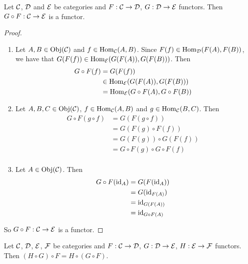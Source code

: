 \documentclass{book}
\begin{document}
	\begin{ex}  
		Let $\mathcal{C}$, $\mathcal{D}$ and $\mathcal{E}$ be categories and $F:\mathcal{C} \rightarrow \mathcal{D}$, $G: \mathcal{D} \rightarrow \mathcal{E}$ functors. Then  $G \circ F: \mathcal{C} \rightarrow \mathcal{E}$ is a functor.
	\end{ex}

	\begin{proof}\
		\begin{enumerate}
				\item Let $A, B \in \operatorname{Obj}(\mathcal{C})$ and $f \in \operatorname{Hom}_{\mathcal{C}}(A,B)$. Since $F(f) \in \operatorname{Hom}_{\mathcal{D}}(F(A), F(B))$, we have that $G(F(f)) \in \operatorname{Hom}_{\mathcal{E}}(G(F(A)), G(F(B)))$. Then 
			\begin{align*}
				G \circ F (f) 
				& = G(F(f)) \\
				& \in \operatorname{Hom}_{\mathcal{E}}(G(F(A)), G(F(B))) \\
				& =  \operatorname{Hom}_{\mathcal{E}}(G \circ F(A), G \circ F (B)) \\
			\end{align*}
			\item Let $A,B, C \in \operatorname{Obj}(\mathcal{C})$, $f \in \operatorname{Hom}_{\mathcal{C}}(A,B)$ and $g \in \operatorname{Hom}_{\mathcal{C}}(B, C)$. Then 
			\begin{align*}
				G \circ F(g \circ f) 
				& = G (F (g \circ f)) \\
				& = G(F(g) \circ F(f)) \\
				& = G(F(g)) \circ G(F(f)) \\
				& = G \circ F (g) \circ G \circ F (f) \\
			\end{align*}
			\item Let $A \in \operatorname{Obj}(\mathcal{C})$. Then 
			\begin{align*}
				G \circ F(\operatorname{id}_{A})
				& = G(F(\operatorname{id}_A) )\\
				& = G(\operatorname{id}_{F(A)}) \\
				& = \operatorname{id}_{G(F(A))} \\
				& = \operatorname{id}_{G \circ F(A)} 
			\end{align*}
		\end{enumerate}
		So $G \circ F: \mathcal{C} \rightarrow \mathcal{E}$ is a functor. 
	\end{proof}

	\begin{ex}  
		Let $\mathcal{C}$, $\mathcal{D}$, $\mathcal{E}$, $\mathcal{F}$ be categories and $F:\mathcal{C} \rightarrow \mathcal{D}$, $G : \mathcal{D} \rightarrow \mathcal{E}$, $H: \mathcal{E} \rightarrow \mathcal{F}$ functors. Then $(H \circ G) \circ F = H \circ (G \circ F)$.
	\end{ex}
\end{document}
